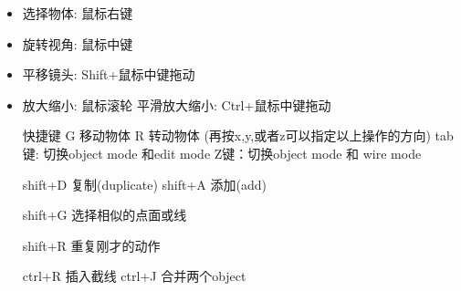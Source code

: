 
\begin{itemize}
\item 选择物体: 鼠标右键
\item 旋转视角: 鼠标中键
\item 平移镜头: Shift+鼠标中键拖动
\item 放大缩小: 鼠标滚轮
平滑放大缩小: Ctrl+鼠标中键拖动

快捷键
G 移动物体
R 转动物体
(再按x,y,或者z可以指定以上操作的方向)
tab键: 切换object mode 和edit mode
Z键：切换object mode 和 wire mode

shift+D 复制(duplicate)
shift+A 添加(add)

shift+G 选择相似的点面或线

shift+R 重复刚才的动作

ctrl+R 插入截线
ctrl+J 合并两个object
\end{itemize}
